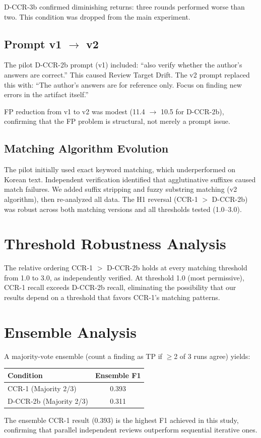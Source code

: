 \documentclass[11pt]{article}
\begin{document}
D-CCR-3b confirmed diminishing returns: three rounds performed worse than two. This condition was dropped from the main experiment.

\subsection{Prompt v1 $\to$ v2}

The pilot D-CCR-2b prompt (v1) included: ``also verify whether the author's answers are correct.'' This caused Review Target Drift.
The v2 prompt replaced this with: ``The author's answers are for reference only.
Focus on finding new errors in the artifact itself.''

FP reduction from v1 to v2 was modest (11.4 $\to$ 10.5 for D-CCR-2b), confirming that the FP problem is structural, not merely a prompt issue.

\subsection{Matching Algorithm Evolution}

The pilot initially used exact keyword matching, which underperformed on Korean text.
Independent verification identified that agglutinative suffixes caused match failures.
We added suffix stripping and fuzzy substring matching (v2 algorithm), then re-analyzed all data.
The H1 reversal (CCR-1 $>$ D-CCR-2b) was robust across both matching versions and all thresholds tested (1.0--3.0).

\section{Threshold Robustness Analysis}

The relative ordering CCR-1 $>$ D-CCR-2b holds at every matching threshold from 1.0 to 3.0, as independently verified.
At threshold 1.0 (most permissive), CCR-1 recall exceeds D-CCR-2b recall, eliminating the possibility that our results depend on a threshold that favors CCR-1's matching patterns.

\section{Ensemble Analysis}

A majority-vote ensemble (count a finding as TP if $\geq$2 of 3 runs agree) yields:

\begin{table}[h]
\centering
\small
\begin{tabular}{lc}
\toprule
\textbf{Condition} & \textbf{Ensemble F1} \\
\midrule
CCR-1 (Majority 2/3) & 0.393 \\
D-CCR-2b (Majority 2/3) & 0.311 \\
\bottomrule
\end{tabular}
\end{table}

The ensemble CCR-1 result (0.393) is the highest F1 achieved in this study, confirming that parallel independent reviews outperform sequential iterative ones.
\end{document}
